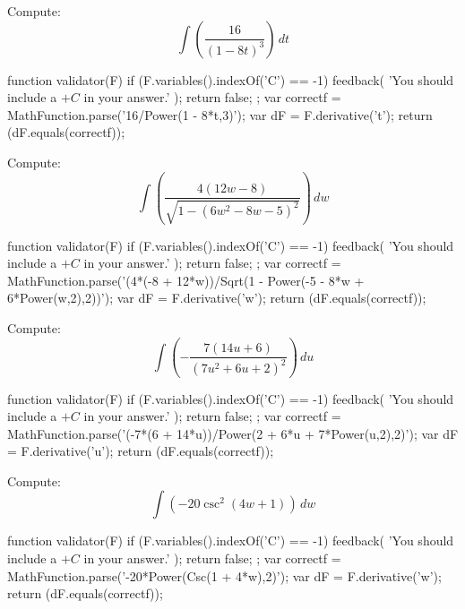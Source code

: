 \documentclass{ximera}
\renewcommand{\d}{\, d}
\begin{document}
\begin{exercise}
Compute: 
\[
\int \left(\frac{16}{(1-8 t)^3}\right)\d t
\]
\begin{expressionAnswer}
     function validator(F) {
      if (F.variables().indexOf('C') == -1) {
        feedback( 'You should include a $+C$ in your answer.' );
        return false;
      };      
      var correctf = MathFunction.parse('16/Power(1 - 8*t,3)');
      var dF = F.derivative('t');
      return (dF.equals(correctf));
    }
\end{expressionAnswer}
\end{exercise}



\begin{exercise}
Compute: 
\[
\int \left(\frac{4 (12 w-8)}{\sqrt{1-\left(6 w^2-8 w-5\right)^2}}\right)\d w
\]
\begin{expressionAnswer}
     function validator(F) {
      if (F.variables().indexOf('C') == -1) {
        feedback( 'You should include a $+C$ in your answer.' );
        return false;
      };      
      var correctf = MathFunction.parse('(4*(-8 + 12*w))/Sqrt(1 - Power(-5 - 8*w + 6*Power(w,2),2))');
      var dF = F.derivative('w');
      return (dF.equals(correctf));
    }
\end{expressionAnswer}
\end{exercise}



\begin{exercise}
Compute: 
\[
\int \left(-\frac{7 (14 u+6)}{\left(7 u^2+6 u+2\right)^2}\right)\d u
\]
\begin{expressionAnswer}
     function validator(F) {
      if (F.variables().indexOf('C') == -1) {
        feedback( 'You should include a $+C$ in your answer.' );
        return false;
      };      
      var correctf = MathFunction.parse('(-7*(6 + 14*u))/Power(2 + 6*u + 7*Power(u,2),2)');
      var dF = F.derivative('u');
      return (dF.equals(correctf));
    }
\end{expressionAnswer}
\end{exercise}



\begin{exercise}
Compute: 
\[
\int \left(-20 \csc ^2(4 w+1)\right)\d w
\]
\begin{expressionAnswer}
     function validator(F) {
      if (F.variables().indexOf('C') == -1) {
        feedback( 'You should include a $+C$ in your answer.' );
        return false;
      };      
      var correctf = MathFunction.parse('-20*Power(Csc(1 + 4*w),2)');
      var dF = F.derivative('w');
      return (dF.equals(correctf));
    }
\end{expressionAnswer}
\end{exercise}
\end{document}
